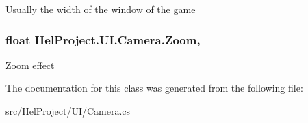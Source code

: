 Usually the width of the window of the game \hypertarget{class_hel_project_1_1_u_i_1_1_camera_a785b2a428a8b4f4401e208a2e1396d42}{}
\subsubsection[{Zoom}]{\setlength{\rightskip}{0pt plus 5cm}float Hel\+Project.\+U\+I.\+Camera.\+Zoom\hspace{0.3cm}{\ttfamily [get]}, {\ttfamily [set]}}\label{class_hel_project_1_1_u_i_1_1_camera_a785b2a428a8b4f4401e208a2e1396d42}


Zoom effect 



The documentation for this class was generated from the following file\+:\begin{DoxyCompactItemize}
\item 
src/\+Hel\+Project/\+U\+I/Camera.\+cs\end{DoxyCompactItemize}
